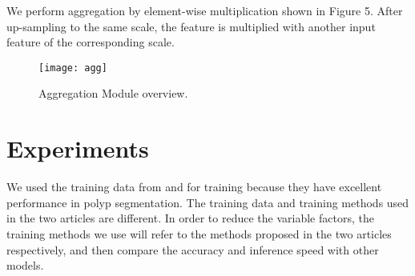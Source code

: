 \documentclass{article}
\begin{document}
    \vspace{4mm}
    \hspace*{0.5cm}We perform aggregation by element-wise multiplication shown in Figure 5. 
    After up-sampling to the same scale, the feature is multiplied with another input feature of the corresponding scale. 


\begin{figure}[htb]
\centering
\texttt{[image: agg]}
\caption{Aggregation Module overview.}
\label{fig:AGG}
\end{figure}

\newpage

\section{Experiments}
    \hspace*{0.5cm}
    We used the training data from \cite{pranet} and \cite{jha2020real} for training because they have excellent performance in polyp segmentation. The training data and training methods used in the two articles are different. In order to reduce the variable factors, the training methods we use will refer to the methods proposed in the two articles respectively, and then compare the accuracy and inference speed with other models.
\end{document}
